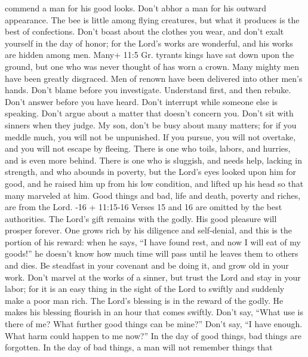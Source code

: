 commend a man for his good looks. Don't abhor a man for his outward
appearance.  The bee is little among flying creatures, but
what it produces is the best of confections.  Don't boast
about the clothes you wear, and don't exalt yourself in the day of
honor; for the Lord's works are wonderful, and his works are hidden
among men.  Many+ 11:5 Gr. tyrants kings have sat down upon
the ground, but one who was never thought of has worn a crown.
 Many mighty men have been greatly disgraced. Men of renown
have been delivered into other men's hands.  Don't blame
before you investigate. Understand first, and then rebuke. 
Don't answer before you have heard. Don't interrupt while someone else
is speaking.  Don't argue about a matter that doesn't
concern you. Don't sit with sinners when they judge.  My
son, don't be busy about many matters; for if you meddle much, you will
not be unpunished. If you pursue, you will not overtake, and you will
not escape by fleeing.  There is one who toils, labors, and
hurries, and is even more behind.  There is one who is
sluggish, and needs help, lacking in strength, and who abounds in
poverty, but the Lord's eyes looked upon him for good, and he raised him
up from his low condition,  and lifted up his head so that
many marveled at him.  Good things and bad, life and death,
poverty and riches, are from the Lord. -16 + 11:15-16
Verses 15 and 16 are omitted by the best authorities.  The
Lord's gift remains with the godly. His good pleasure will prosper
forever.  One grows rich by his diligence and self-denial,
and this is the portion of his reward:  when he says, ``I
have found rest, and now I will eat of my goods!'' he doesn't know how
much time will pass until he leaves them to others and dies.
 Be steadfast in your covenant and be doing it, and grow
old in your work.  Don't marvel at the works of a sinner,
but trust the Lord and stay in your labor; for it is an easy thing in
the sight of the Lord to swiftly and suddenly make a poor man rich.
 The Lord's blessing is in the reward of the godly. He
makes his blessing flourish in an hour that comes swiftly. 
Don't say, ``What use is there of me? What further good things can be
mine?''  Don't say, ``I have enough. What harm could happen
to me now?''  In the day of good things, bad things are
forgotten. In the day of bad things, a man will not remember things that
